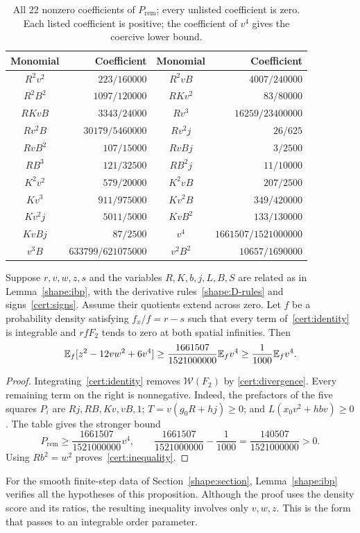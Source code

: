 \begin{table}[htbp]
\centering
\renewcommand{\arraystretch}{1.16}
\begin{tabular}{c|r@{\qquad}c|r}
Monomial & Coefficient & Monomial & Coefficient\\ \hline
$R^2v^2$ & $223/160000$ & $R^2vB$ & $4007/240000$\\
$R^2B^2$ & $1097/120000$ & $RKv^2$ & $83/80000$\\
$RKvB$ & $3343/24000$ & $Rv^3$ & $16259/23400000$\\
$Rv^2B$ & $30179/5460000$ & $Rv^2j$ & $26/625$\\
$RvB^2$ & $107/15000$ & $RvBj$ & $3/2500$\\
$RB^3$ & $121/32500$ & $RB^2j$ & $11/10000$\\
$K^2v^2$ & $579/20000$ & $K^2vB$ & $207/2500$\\
$Kv^3$ & $911/975000$ & $Kv^2B$ & $349/420000$\\
$Kv^2j$ & $5011/5000$ & $KvB^2$ & $133/130000$\\
$KvBj$ & $87/2500$ & $v^4$ & $1661507/1521000000$\\
$v^3B$ & $633799/621075000$ & $v^2B^2$ & $10657/1690000$
\end{tabular}
\caption{All 22 nonzero coefficients of $P_{\mathrm{rem}}$; every unlisted
coefficient is zero.  Each listed coefficient is positive; the coefficient
of $v^4$ gives the coercive lower bound.}
\label{cert:table}
\end{table}

\begin{proposition}\label{cert:coercivity}
Suppose $r,v,w,z,s$ and the variables $R,K,b,j,L,B,S$ are related as in
Lemma~\ref{shape:ibp}, with the derivative rules~\eqref{shape:D-rules}
and signs~\eqref{cert:signs}.  Assume their quotients extend across zero.
Let $f$ be a probability density satisfying $f_x/f=r-s$ such that every
term of~\eqref{cert:identity} is integrable and $rfF_2$ tends to zero at both
spatial infinities.  Then
\begin{equation}\label{cert:inequality}
 \mathbb E_f[z^2-12vw^2+6v^4]
 \geq\frac{1661507}{1521000000}\mathbb E_fv^4
 \geq\frac1{1000}\mathbb E_fv^4.
\end{equation}
\end{proposition}

\begin{proof}
Integrating~\eqref{cert:identity} removes $\mathcal W(F_2)$ by
\eqref{cert:divergence}.  Every remaining term on the right is nonnegative.
Indeed, the prefactors of the five squares $P_i$ are $Rj,RB,Kv,vB,1$;
$T=v(g_0R+hj)\geq0$; and $L(x_0v^2+hbv)\geq0$.
The table gives the stronger bound
\[
 P_{\mathrm{rem}}\geq\frac{1661507}{1521000000}v^4,
 \qquad
 \frac{1661507}{1521000000}-\frac1{1000}
       =\frac{140507}{1521000000}>0.
\]
Using $Rb^2=w^2$ proves~\eqref{cert:inequality}.
\end{proof}

For the smooth finite-step data of Section~\ref{shape:section},
Lemma~\ref{shape:ibp} verifies all the hypotheses of this proposition.
Although the proof uses the density score and its ratios, the resulting
inequality involves only $v,w,z$.  This is the form that passes to an
integrable order parameter.

